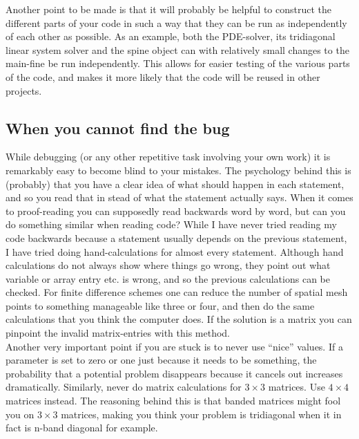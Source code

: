 Another point to be made is that it will probably be helpful to construct the different parts of your code in such a way that they can be run as independently of each other as possible. 
As an example, both the PDE-solver, its tridiagonal linear system solver and the spine object can with relatively small changes to the main-fine be run independently. 
This allows for easier testing of the various parts of the code, and makes it more likely that the code will be reused in other projects.

\subsection{When you cannot find the bug}

While debugging (or any other repetitive task involving your own work) it is remarkably easy to become blind to your mistakes. 
The psychology behind this is (probably) that you have a clear idea of what should happen in each statement, and so you read that in stead of what the statement actually says. 
When it comes to proof-reading you can supposedly read backwards word by word, but can you do something similar when reading code? 
While I have never tried reading my code backwards because a statement usually depends on the previous statement, I have tried doing hand-calculations for almost every statement. 
Although hand calculations do not always show where things go wrong, they point out what variable or array entry etc. is wrong, and so the previous calculations can be checked. 
For finite difference schemes one can reduce the number of spatial mesh points to something manageable like three or four, and then do the same calculations that you think the computer does. If the solution is a matrix you can pinpoint the invalid matrix-entries with this method.\\

Another very important point if you are stuck is to never use ``nice'' values. 
If a parameter is set to zero or one just because it needs to be something, the probability that a potential problem disappears because it cancels out increases dramatically. 
Similarly, never do matrix calculations for $3\times 3$ matrices. Use $4\times4$ matrices instead. The reasoning behind this is that banded matrices might fool you on $3\times 3$ matrices, making you think your problem is tridiagonal when it in fact is n-band diagonal for example.